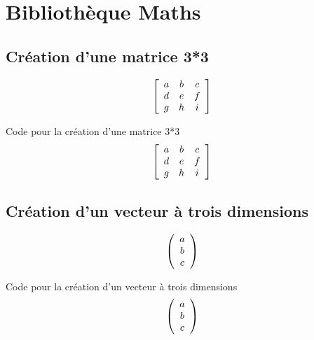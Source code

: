 \chapter{Bibliothèque Maths}

\section{Création d'une matrice 3*3}

$$\left [\begin{array}{ccc} a & b & c \\ d & e & f \\ g & h & i\end{array} \right ]  $$
\vskip 0.5cm

\begin{Latex}{Code pour la création d'une matrice 3*3}
    $$\left [\begin{array}{ccc} a & b & c \\ d & e & f \\ g & h & i\end{array} \right ]  $$
\end{Latex}

\section{Création d'un vecteur à trois dimensions}

$$\left (\begin{array}{ccc} a \\ b \\ c\end{array} \right )  $$
\vskip 0.5cm

\begin{Latex}{Code pour la création d'un vecteur à trois dimensions}
    $$\left (\begin{array}{ccc} a \\ b \\ c\end{array} \right )  $$
\end{Latex}